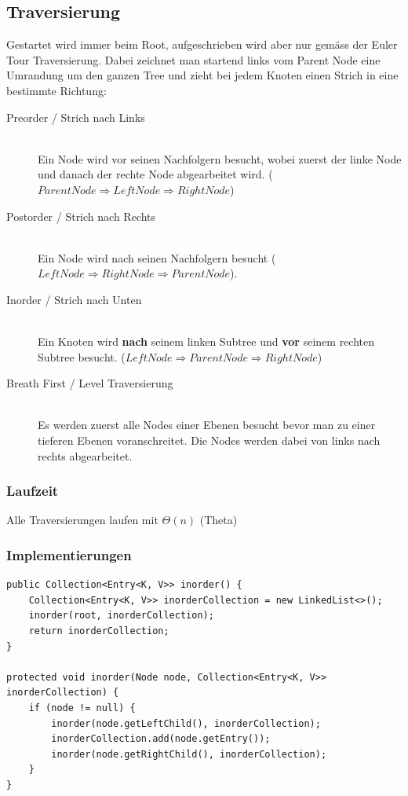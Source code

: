 \subsection{Traversierung}
Gestartet wird immer beim Root, aufgeschrieben wird aber nur gemäss der Euler Tour Traversierung. Dabei zeichnet man startend links vom Parent Node eine Umrandung um den ganzen Tree und zieht bei jedem Knoten einen Strich in eine bestimmte Richtung:
\begin{description}
	\item[Preorder / Strich nach Links] \hfill \\
	Ein Node wird vor seinen Nachfolgern besucht, wobei zuerst der linke Node und danach der rechte Node abgearbeitet wird. ($Parent Node \Rightarrow Left Node \Rightarrow Right Node$)
	\item[Postorder / Strich nach Rechts] \hfill \\
	Ein Node wird nach seinen Nachfolgern besucht ($Left Node \Rightarrow Right Node \Rightarrow Parent Node$).
	\item[Inorder / Strich nach Unten] \hfill \\
	Ein Knoten wird \textbf{nach} seinem linken Subtree und \textbf{vor} seinem rechten Subtree besucht.
	($Left Node \Rightarrow Parent Node \Rightarrow Right Node$)
	\item[Breath First / Level Traversierung] \hfill \\
	Es werden zuerst alle Nodes einer Ebenen besucht bevor man zu einer tieferen Ebenen voranschreitet. Die Nodes werden dabei von links nach rechts abgearbeitet.
\end{description}
\clearpage
\subsubsection{Laufzeit}
Alle Traversierungen laufen mit $\Theta(n)$ (Theta)

\subsubsection{Implementierungen}
\begin{lstlisting}[caption=Inorder Traversal]
public Collection<Entry<K, V>> inorder() {
	Collection<Entry<K, V>> inorderCollection = new LinkedList<>();
	inorder(root, inorderCollection);
	return inorderCollection;
}

protected void inorder(Node node, Collection<Entry<K, V>> inorderCollection) {
	if (node != null) {
		inorder(node.getLeftChild(), inorderCollection);
		inorderCollection.add(node.getEntry());
		inorder(node.getRightChild(), inorderCollection);
	}
}

\end{lstlisting}

